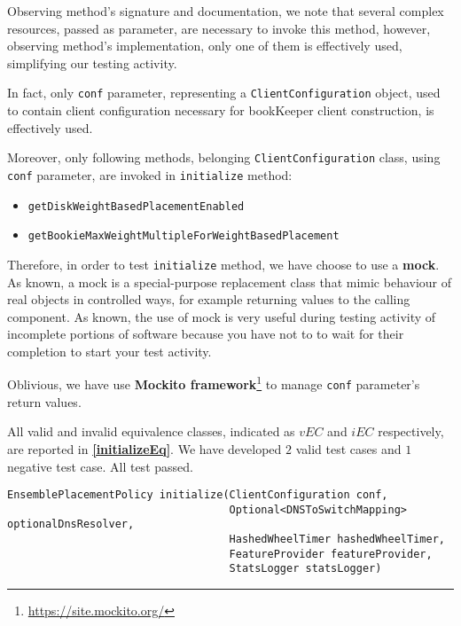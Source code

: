 \documentclass[sigconf]{acmart}
\begin{document}
Observing method's signature and documentation, we note that several complex resources, passed as parameter, are necessary to invoke this method, however, observing method's implementation, only one of them is effectively used, simplifying our testing activity.

In fact, only \texttt{conf} parameter, representing a \texttt{Client\-Configu\-ration} object, used to contain client configuration necessary for bookKeeper client construction, is effectively used. 

Moreover, only following methods, belonging \texttt{Client\-Configu\-ration} class, using \texttt{conf} parameter, are invoked in \texttt{initialize} method:

\begin{itemize}
\item \texttt{getDiskWeightBasedPlacementEnabled}
\item \texttt{getBookieMaxWeightMultipleForWeightBasedPlacement}
\end{itemize}

Therefore, in order to test \texttt{initialize} method, we have choose to use a \textbf{mock}. As known, a mock is a special-purpose replacement class that mimic behaviour of real objects in controlled ways, for example returning values to the calling component. As known, the use of mock is very useful during testing activity of incomplete portions of software because you have not to to wait for their completion to start your test activity. 

Oblivious, we have use \textbf{Mockito framework}\footnote{\url{https://site.mockito.org/}} to manage \texttt{conf} parameter's return values.

All valid and invalid equivalence classes, indicated as $vEC$ and $iEC$ respectively, are reported in \textbf{\cref{initializeEq}}. We have developed $2$ valid test cases and $1$ negative test case. All test passed.

\begin{lstlisting}[frame=lines,basicstyle=\ttfamily\tiny, caption={Signature of method \texttt{initialize}}, label={initializeSignature}]
EnsemblePlacementPolicy initialize(ClientConfiguration conf,
                                   Optional<DNSToSwitchMapping> optionalDnsResolver,
                                   HashedWheelTimer hashedWheelTimer,
                                   FeatureProvider featureProvider,
                                   StatsLogger statsLogger)
\end{lstlisting}
\end{document}
